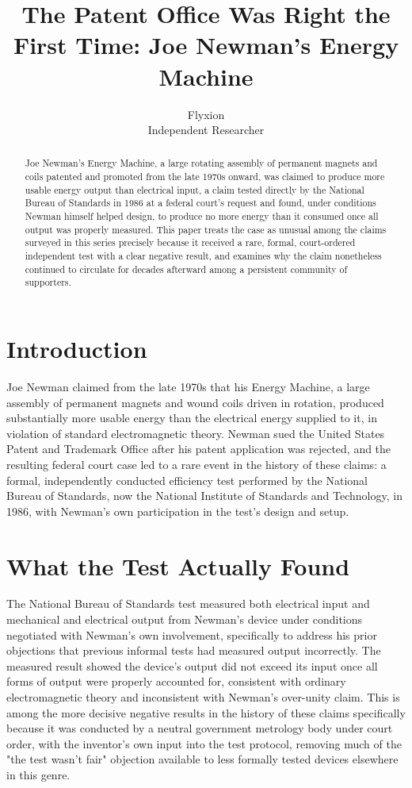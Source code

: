\documentclass[11pt]{article}
\title{The Patent Office Was Right the First Time: Joe Newman's Energy Machine}
\author{Flyxion \\ \small Independent Researcher}
\date{}
\begin{document}
\maketitle

\begin{abstract}
Joe Newman's Energy Machine, a large rotating assembly of permanent magnets and coils patented and promoted from the late 1970s onward, was claimed to produce more usable energy output than electrical input, a claim tested directly by the National Bureau of Standards in 1986 at a federal court's request and found, under conditions Newman himself helped design, to produce no more energy than it consumed once all output was properly measured. This paper treats the case as unusual among the claims surveyed in this series precisely because it received a rare, formal, court-ordered independent test with a clear negative result, and examines why the claim nonetheless continued to circulate for decades afterward among a persistent community of supporters.
\end{abstract}

\section{Introduction}

Joe Newman claimed from the late 1970s that his Energy Machine, a large assembly of permanent magnets and wound coils driven in rotation, produced substantially more usable energy than the electrical energy supplied to it, in violation of standard electromagnetic theory. Newman sued the United States Patent and Trademark Office after his patent application was rejected, and the resulting federal court case led to a rare event in the history of these claims: a formal, independently conducted efficiency test performed by the National Bureau of Standards, now the National Institute of Standards and Technology, in 1986, with Newman's own participation in the test's design and setup.

\section{What the Test Actually Found}

The National Bureau of Standards test measured both electrical input and mechanical and electrical output from Newman's device under conditions negotiated with Newman's own involvement, specifically to address his prior objections that previous informal tests had measured output incorrectly. The measured result showed the device's output did not exceed its input once all forms of output were properly accounted for, consistent with ordinary electromagnetic theory and inconsistent with Newman's over-unity claim. This is among the more decisive negative results in the history of these claims specifically because it was conducted by a neutral government metrology body under court order, with the inventor's own input into the test protocol, removing much of the "the test wasn't fair" objection available to less formally tested devices elsewhere in this genre.
\end{document}
